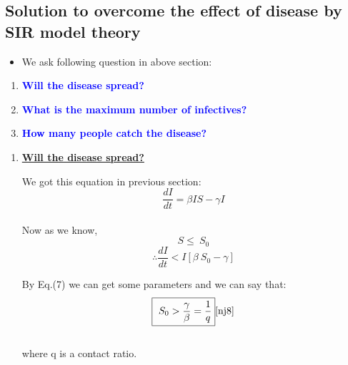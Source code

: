 \documentclass[12pt]{article}
\begin{document}
{\begin{enumerate}
\end{enumerate}
\newpage

\subsection{ Solution to overcome the effect of disease by SIR model theory}
\begin{itemize}
\item We ask following question in above section:
\end{itemize}
\begin{enumerate}
\item\textcolor{blue}{\bf  Will the disease spread?}\cite{nj8}
\item\textcolor{blue} {\bf What is the maximum number of infectives?}\cite{nj8}
\item\textcolor{blue} {\bf How many people  catch the disease?}\cite{nj8}
\end{enumerate}
\begin{enumerate}
\item{\bf\underline{Will the disease spread?}}\\
\par We got  this equation in previous section:
$$\frac{dI}{dt} =\beta IS-\gamma I $$
\\
Now as we know,
\begin{equation}
S\leq\ S_{0}
\end{equation}
\begin{equation}
\therefore \boxed{\frac{dI}{dt}< I[\beta \ S_{0}-\gamma]}
\end{equation}
\par By Eq.(7) we can get some parameters and we can say that:\\
\begin{equation}
 \boxed{\ S_{0}>\frac{\gamma}{\beta}=\frac{1}{q}}\cite{nj8}
\end{equation}
\\
where q is a contact ratio.


\end{enumerate}}
\end{document}
